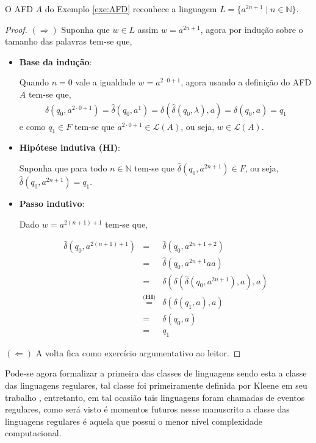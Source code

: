 \begin{example}
	O AFD $A$ do Exemplo \ref{exe:AFD} reconhece a linguagem $L = \{a^{2n + 1} \mid n \in \mathbb{N}\}$.
	\begin{proof}
		$(\Rightarrow)$ Suponha que $w \in L$ assim $w = a^{2n+1}$, agora por indução sobre o tamanho das palavras tem-se que, 
		
		\begin{itemize}
			\item \textbf{Base da indução}:
			
			Quando $n = 0$ vale a igualdade $w = a^{2\cdot 0+1}$, agora usando a definição do AFD $A$ tem-se que, 
			\begin{eqnarray*}
				\widehat{\delta}(q_0, a^{2\cdot 0+1}) = \widehat{\delta}(q_0, a^{1}) = \delta(\widehat{\delta}(q_0, \lambda), a) = \delta(q_0, a) = q_1
			\end{eqnarray*}
			e como $q_1 \in F$ tem-se que $a^{2\cdot 0+1} \in \mathcal{L}(A)$, ou seja, $w \in \mathcal{L}(A)$.
			
			\item \textbf{Hipótese indutiva (HI)}:
			
			Suponha que para todo $n \in \mathbb{N}$ tem-se que $\widehat{\delta}(q_0, a^{2n+1}) \in F$, ou seja, $\widehat{\delta}(q_0, a^{2n+1}) = q_1$.
			
			\item \textbf{Passo indutivo}:
			
			Dado $w = a^{2(n+1)+1}$ tem-se que,
			
			\begin{eqnarray*}
				\widehat{\delta}(q_0, a^{2(n+1)+1}) & = & \widehat{\delta}(q_0, a^{2n+1+2})\\
				& = & \widehat{\delta}(q_0, a^{2n+1}aa)\\
				& = & \delta(\delta(\widehat{\delta}(q_0, a^{2n+1}), a), a)\\
				& \stackrel{\textbf{(HI)}}{=} & \delta(\delta(q_1, a), a)\\
				& = & \delta(q_0, a)\\
				& = & q_1
			\end{eqnarray*}
		\end{itemize}
		$(\Leftarrow)$ A volta fica como exercício argumentativo ao leitor.
	\end{proof}
\end{example}

Pode-se agora formalizar a primeira das classes de linguagens sendo esta a classe das linguagens regulares, tal classe foi primeiramente definida por Kleene em seu trabalho \cite{kleene1951}, entretanto, em tal ocasião tais linguagens foram chamadas de eventos regulares, como será visto é momentos futuros nesse manuscrito a classe das linguagens regulares é aquela que possui o menor nível complexidade computacional.

